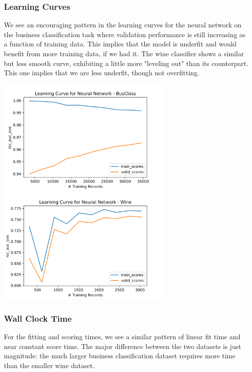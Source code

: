 \documentclass[
	letterpaper, %
]{jdf}
\begin{document}
\subsubsection{Learning Curves}
We see an encouraging pattern in the learning curves for the neural network on the business classification task where validation performance is still increasing as a function of training data. This implies that the model is underfit and would benefit from more training data, if we had it. The wine classifier shows a similar but less smooth curve, exhibiting a little more "leveling out" than its counterpart. This one implies that we are less underfit, though not overfitting.

\includegraphics[width=3.4in]{Figures/BusClass-0920/NN/learn_curve.png}
\includegraphics[width=3.4in]{Figures/Wine-0921/NN/learn_curve.png}

\subsubsection{Wall Clock Time}
For the fitting and scoring times, we see a similar pattern of linear fit time and near constant score time. The major difference between the two datasets is just magnitude: the much larger business classification dataset requires more time than the smaller wine dataset.
\end{document}
